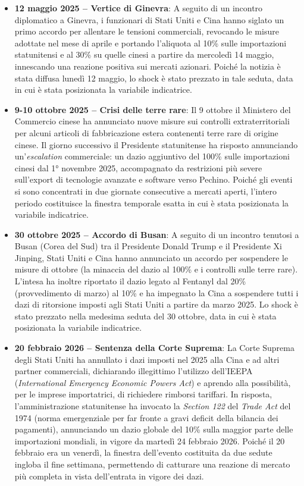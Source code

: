 \begin{itemize}
\item \textbf{12 maggio 2025 -- Vertice di Ginevra}: A seguito di un incontro diplomatico a Ginevra, i funzionari di Stati Uniti e Cina hanno siglato un primo accordo per allentare le tensioni commerciali, revocando 
le misure adottate nel mese di aprile e portando l'aliquota al 10\% sulle importazioni statunitensi e al 30\% su quelle cinesi a partire da mercoledì 
14 maggio, innescando una reazione positiva sui mercati azionari\cite{csis:deescalation}. Poiché la notizia è stata diffusa lunedì 12 maggio, lo shock è stato prezzato in tale 
seduta, data in cui è stata posizionata la variabile indicatrice.

\item \textbf{9-10 ottobre 2025 -- Crisi delle terre rare}: Il 9 ottobre il Ministero del Commercio cinese ha annunciato nuove misure sui controlli extraterritoriali per alcuni articoli di fabbricazione estera contenenti terre 
rare di origine cinese\cite{jonesday:rareearth}. Il giorno successivo il Presidente statunitense ha risposto annunciando un'\emph{escalation} commerciale: un 
dazio aggiuntivo del 100\% sulle importazioni cinesi dal 1° novembre 2025, accompagnato da restrizioni più severe sull'export di tecnologie avanzate e 
software verso Pechino\cite{guardian:tariffs}. Poiché gli eventi si sono concentrati in due giornate consecutive a mercati aperti, l'intero periodo costituisce la finestra temporale esatta in 
cui è stata posizionata la variabile indicatrice.

\item \textbf{30 ottobre 2025 -- Accordo di Busan}: A seguito di un incontro tenutosi a Busan (Corea del Sud) tra il Presidente Donald Trump e il Presidente Xi Jinping, Stati Uniti e Cina hanno annunciato un accordo per 
sospendere le misure di ottobre (la minaccia del dazio al 100\% e i controlli sulle terre rare). L'intesa ha inoltre riportato il dazio legato al 
Fentanyl dal 20\% (provvedimento di marzo) al 10\% e ha impegnato la Cina a sospendere tutti i dazi di ritorsione imposti agli Stati Uniti a partire da marzo 2025\cite{mofo:agreement}. 
Lo shock è stato prezzato nella medesima seduta del 30 ottobre, data in cui è stata posizionata la variabile indicatrice.

\item \textbf{20 febbraio 2026 -- Sentenza della Corte Suprema}: La Corte Suprema degli Stati Uniti ha annullato i dazi imposti nel 2025 alla Cina e ad altri partner commerciali, dichiarando illegittimo l'utilizzo 
dell'IEEPA (\emph{International Emergency Economic Powers Act}) e aprendo alla possibilità, per le imprese importatrici, di richiedere rimborsi tariffari. In risposta, 
l'amministrazione statunitense ha invocato la \emph{Section 122} del \emph{Trade Act} del 1974 (norma emergenziale per far fronte a gravi deficit della 
bilancia dei pagamenti), annunciando un dazio globale del 10\% sulla maggior parte delle importazioni mondiali, in vigore da martedì 
24 febbraio 2026\cite{crs:ieepa}. Poiché il 20 febbraio era un venerdì, la finestra dell'evento costituita da due sedute ingloba il fine settimana, permettendo di catturare una reazione 
di mercato più completa in vista dell'entrata in vigore dei dazi.


\end{itemize}
